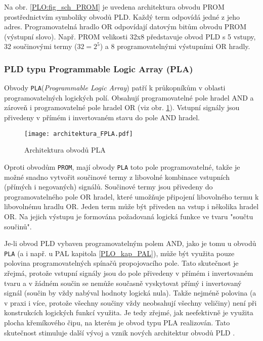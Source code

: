         Na obr. \ref{PLO:fig_sch_PROM} je uvedena architektura obvodu PROM prostřednictvím
        symboliky obvodů PLD. Každý term odpovídá jedné z jeho adres. Programovatelná hradlo OR
        odpovídají datovým bitům obvodu PROM (výstupní slovo). Např. PROM velikosti 32x8
        představuje obvod PLD s 5 vstupy, 32 součinovými termy ($32=2^5$) a 8 programovatelnými
        výstupními OR hradly.

     \subsubsection{PLD typu Programmable Logic Array (PLA)}\label{PLO_kap_FPLA}
        Obvody \texttt{PLA}(\emph{Programmable Logic Array}) patří k průkopníkům v oblasti
        programovatelných logických polí. Obsahují programovatelné pole hradel AND a zároveň i
        programovatelné pole hradel OR (viz obr. \ref{PLO:fig_arch_FPLA}).
        Vstupní signály jsou přivedeny v přímém i invertovaném stavu do pole AND hradel.
        \begin{figure}[ht!]
          \centering
          \texttt{[image: architektura\_FPLA.pdf]}
          \caption[Architektura obvodů PLA]{Architektura obvodů PLA}
          \label{PLO:fig_arch_FPLA}
        \end{figure}
        
        Oproti obvodům \texttt{PROM}, mají obvody \texttt{PLA} toto pole programovatelné, takže je
        možné snadno vytvořit součinové termy z libovolné kombinace vstupních (přímých i
        negovaných) signálů. Součinové termy jsou přivedeny do programovatelného pole OR hradel,
        které umožňuje připojení libovolného termu k libovolnému hradlu OR. Jeden term může být
        přiveden na vstup i několika hradel OR. Na jejich výstupu je formována požadovaná logická
        funkce ve tvaru "součtu součinů".

        Je-li obvod PLD vybaven programovatelným polem AND, jako je tomu u obvodů \texttt{PLA} (a i
        např. u PAL kapitola \ref{PLO_kap_PAL}), může být využita pouze polovina programovatelných
        spínačů propojovacího pole. Tato skutečnost je zřejmá, protože vstupní signály jsou do pole
        přivedeny v přímém i invertovaném tvaru a v žádném součin se nemůže současně vyskytovat
        přímý i invertovaný signál (součin by vždy nabýval hodnoty logická nula). Takže nejméně
        polovina (a v praxi i více, protože všechny součiny vždy neobsahují všechny veličiny) není
        při konstrukcích logických funkcí využita. Je tedy zřejmé, jak neefektivně je využita
        plocha křemíkového čipu, na kterém je obvod typu PLA realizován. Tato skutečnost stimuluje
        další vývoj a vznik nových architektur obvodů PLD \cite[s.~63]{PLD_Grada}.
        
